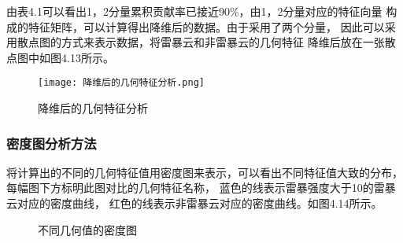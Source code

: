 由表4.1可以看出1，2分量累积贡献率已接近90$\%$，由1，2分量对应的特征向量
构成的特征矩阵，可以计算得出降维后的数据。由于采用了两个分量，
因此可以采用散点图的方式来表示数据，将雷暴云和非雷暴云的几何特征
降维后放在一张散点图中如图4.13所示。

\begin{figure}[htb]
    \centering
    \texttt{[image: 降维后的几何特征分析.png]}
    \caption{降维后的几何特征分析}
\end{figure}

\subsubsection{密度图分析方法}
将计算出的不同的几何特征值用密度图来表示，可以看出不同特征值大致的分布，
每幅图下方标明此图对比的几何特征名称，
蓝色的线表示雷暴强度大于10的雷暴云对应的密度曲线，
红色的线表示非雷暴云对应的密度曲线。如图4.14所示。
\begin{figure}
    \centering
    \caption{不同几何值的密度图}
    \end{figure}

